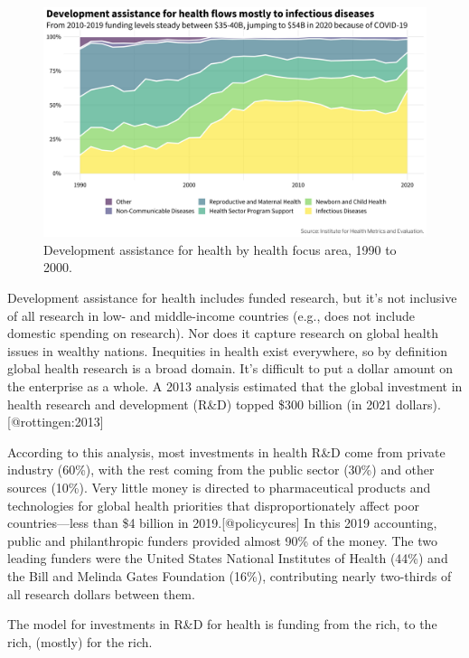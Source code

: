 \documentclass[
  letterpaper,
  DIV=11,
  numbers=noendperiod,
  oneside]{scrartcl}
\begin{document}
\begin{figure}[H]

{\centering \includegraphics{images/figures/dah.png}

}

\caption{Development assistance for health by health focus area, 1990 to
2000.}

\end{figure}

Development assistance for health includes funded research, but it's not
inclusive of all research in low- and middle-income countries (e.g.,
does not include domestic spending on research). Nor does it capture
research on global health issues in wealthy nations. Inequities in
health exist everywhere, so by definition global health research is a
broad domain. It's difficult to put a dollar amount on the enterprise as
a whole. A 2013 analysis estimated that the global investment in health
research and development (R\&D) topped \$300 billion (in 2021
dollars).{[}@rottingen:2013{]}

According to this analysis, most investments in health R\&D come from
private industry (60\%), with the rest coming from the public sector
(30\%) and other sources (10\%). Very little money is directed to
pharmaceutical products and technologies for global health priorities
that disproportionately affect poor countries---less than \$4 billion in
2019.{[}@policycures{]} In this 2019 accounting, public and
philanthropic funders provided almost 90\% of the money. The two leading
funders were the United States National Institutes of Health (44\%) and
the Bill and Melinda Gates Foundation (16\%), contributing nearly
two-thirds of all research dollars between them.

The model for investments in R\&D for health is funding from the rich,
to the rich, (mostly) for the rich.
\end{document}
